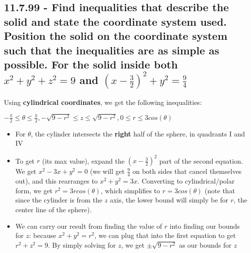 \documentclass{article}
\begin{document}
\subsection{11.7.99 - Find inequalities that describe the solid and state the coordinate system used.  Position the solid on the coordinate system such that the inequalities are as simple as possible.  For the solid inside both $x^{2} + y^{2} + z^{2} = 9$ and $(x - \frac{3}{2})^{2} + y^{2} = \frac{9}{4}$}
\par\noindent\large Using \textbf{cylindrical coordinates}, we get the following inequalities:
\par\noindent\Large $-\frac{\pi}{2} \leq \theta \leq \frac{\pi}{2}, -\sqrt{9 - r^{2}} \leq z \leq \sqrt{9 - r^{2}}, 0 \leq r \leq 3cos(\theta)$\vspace{0.25cm}
\par\noindent\large
\begin{itemize}
    \item For $\theta$, the cylinder intersects the \textbf{right} half of the sphere, in quadrants I and IV
    \item To get $r$ (its max value), expand the $(x - \frac{3}{2})^{2}$ part of the second equation.  We get $x^{2} - 3x + y^{2} = 0$ (we will get $\frac{9}{4}$ on both sides that cancel themselves out), and this rearranges to $x^{2} + y^{2} = 3x$.  Converting to cylindrical/polar form, we get $r^{2} = 3rcos(\theta)$, which simplifies to $r = 3cos(\theta)$ (note that since the cylinder is from the $z$ axis, the lower bound will simply be for $r$, the center line of the sphere).
    \item We can carry our result from finding the value of $r$ into finding our bounds for $z$: because $x^{2} + y^{2} = r^{2}$, we can plug that into the first equation to get $r^{2} + z^{2} = 9$.  By simply solving for $z$, we get $\pm\sqrt{9 - r^{2}}$ as our bounds for $z$
\end{itemize}
\end{document}
